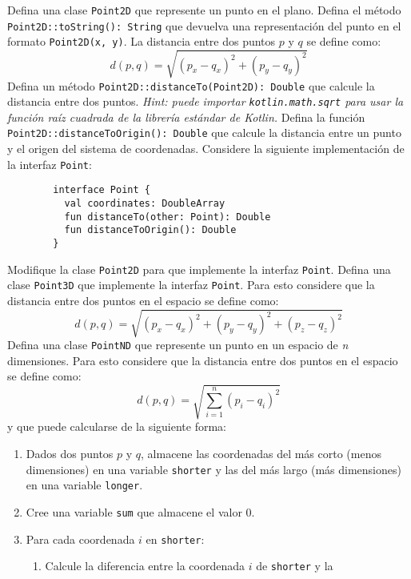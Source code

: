   \begin{Exercise}[title={Puntos en el espacio}, label={oop:principios:ejercicios:puntos}]
    \Question Defina una clase \texttt{Point2D} que represente un punto en el plano.
    \Question Defina el método \texttt{Point2D::toString(): String} que devuelva una representación del 
      punto en el formato \texttt{Point2D(x, y)}.
    \Question La distancia entre dos puntos \(p\) y \(q\) se define como:
      \[d(p, q) = \sqrt{(p_x - q_x)^2 + (p_y - q_y)^2}\]
      Defina un método \texttt{Point2D::distanceTo(Point2D): Double} que calcule la distancia entre dos 
      puntos.
      \textit{Hint: puede importar \texttt{kotlin.math.sqrt} para usar la función raíz cuadrada de 
      la librería estándar de \textit{Kotlin}.}
    \Question Defina la función \texttt{Point2D::distanceToOrigin(): Double} que calcule la 
      distancia entre un punto y el origen del sistema de coordenadas.
    \Question Considere la siguiente implementación de la interfaz \texttt{Point}:
      \begin{verbatim}
        interface Point {
          val coordinates: DoubleArray
          fun distanceTo(other: Point): Double
          fun distanceToOrigin(): Double
        }
      \end{verbatim}
      Modifique la clase \texttt{Point2D} para que implemente la interfaz \texttt{Point}.
    \Question Defina una clase \texttt{Point3D} que implemente la interfaz \texttt{Point}.
      Para esto considere que la distancia entre dos puntos en el espacio se define como:
      \[d(p, q) = \sqrt{(p_x - q_x)^2 + (p_y - q_y)^2 + (p_z - q_z)^2}\]
    \Question Defina una clase \texttt{PointND} que represente un punto en un espacio de 
      \textit{n} dimensiones.
      Para esto considere que la distancia entre dos puntos en el espacio se define como:
      \[d(p, q) = \sqrt{\sum_{i=1}^n (p_i - q_i)^2}\]
      y que puede calcularse de la siguiente forma:
      \begin{enumerate}
        \item Dados dos puntos \(p\) y \(q\), almacene las coordenadas del más corto (menos 
          dimensiones) en una variable \texttt{shorter} y las del más largo (más dimensiones) en una
          variable \texttt{longer}.
        \item Cree una variable \texttt{sum} que almacene el valor 0.
        \item Para cada coordenada \(i\) en \texttt{shorter}:
          \begin{enumerate}
            \item Calcule la diferencia entre la coordenada \(i\) de \texttt{shorter} y la 

\end{enumerate}
\end{enumerate}
\end{Exercise}
